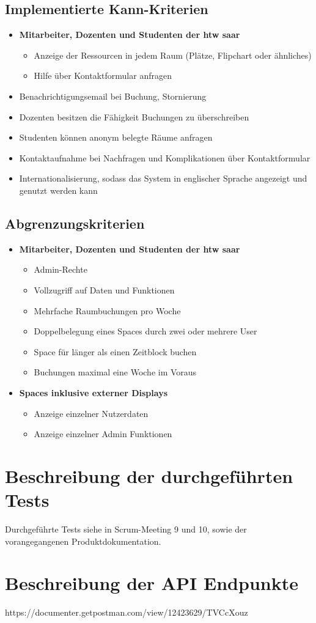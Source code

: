 \documentclass[a4paper,report,headsepline]{scrreprt}
\begin{document}
\section{Implementierte Kann-Kriterien}

\begin{itemize}
\item \textbf{Mitarbeiter, Dozenten und Studenten der htw saar}
\begin{itemize}
\item Anzeige der Ressourcen in jedem Raum (Plätze, Flipchart oder ähnliches)
\item Hilfe über Kontaktformular anfragen
\end{itemize}

\item Benachrichtigungsemail bei Buchung, Stornierung
\item Dozenten besitzen die Fähigkeit Buchungen zu überschreiben
\item Studenten können anonym belegte Räume anfragen
\item Kontaktaufnahme bei Nachfragen und Komplikationen über Kontaktformular
\item Internationalisierung, sodass das System in englischer Sprache angezeigt und genutzt werden kann
\end{itemize}

\section{Abgrenzungskriterien}\label{abgrenzungskriterien}
\begin{itemize}
\item \textbf{Mitarbeiter, Dozenten und Studenten der htw saar}
\begin{itemize}
\item Admin-Rechte 
\item Vollzugriff auf Daten und Funktionen
\item Mehrfache Raumbuchungen pro Woche 
\item Doppelbelegung eines Spaces durch zwei oder mehrere User
\item Space für länger als einen Zeitblock buchen
\item Buchungen maximal eine Woche im Voraus 
\end{itemize}

\item \textbf{Spaces inklusive externer Displays}
\begin{itemize}
\item Anzeige einzelner Nutzerdaten
\item Anzeige einzelner Admin Funktionen
\end{itemize}
\end{itemize}
\chapter{Beschreibung der durchgeführten Tests}
Durchgeführte Tests siehe in Scrum-Meeting 9 und 10, sowie der vorangegangenen Produktdokumentation.
\chapter{Beschreibung der API Endpunkte}  
https://documenter.getpostman.com/view/12423629/TVCcXouz      
\end{document}
